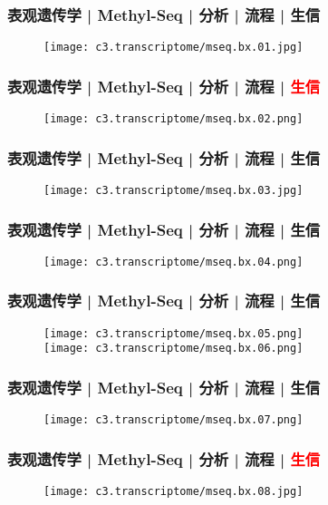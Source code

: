 \begin{frame}
  \frametitle{表观遗传学 | Methyl-Seq | 分析 | 流程 | 生信}
  \begin{figure}
    \centering
    \texttt{[image: c3.transcriptome/mseq.bx.01.jpg]}
  \end{figure}
\end{frame}

\begin{frame}
  \frametitle{表观遗传学 | Methyl-Seq | 分析 | 流程 | \textcolor{red}{生信}}
  \begin{figure}
    \centering
    \texttt{[image: c3.transcriptome/mseq.bx.02.png]}
  \end{figure}
\end{frame}

\begin{frame}
  \frametitle{表观遗传学 | Methyl-Seq | 分析 | 流程 | 生信}
  \begin{figure}
    \centering
    \texttt{[image: c3.transcriptome/mseq.bx.03.jpg]}
  \end{figure}
\end{frame}

\begin{frame}
  \frametitle{表观遗传学 | Methyl-Seq | 分析 | 流程 | 生信}
  \begin{figure}
    \centering
    \texttt{[image: c3.transcriptome/mseq.bx.04.png]}
  \end{figure}
\end{frame}

\begin{frame}
  \frametitle{表观遗传学 | Methyl-Seq | 分析 | 流程 | 生信}
  \begin{figure}
    \centering
    \texttt{[image: c3.transcriptome/mseq.bx.05.png]}\\
    \texttt{[image: c3.transcriptome/mseq.bx.06.png]}
  \end{figure}
\end{frame}

\begin{frame}
  \frametitle{表观遗传学 | Methyl-Seq | 分析 | 流程 | 生信}
  \begin{figure}
    \centering
    \texttt{[image: c3.transcriptome/mseq.bx.07.png]}
  \end{figure}
\end{frame}

\begin{frame}
  \frametitle{表观遗传学 | Methyl-Seq | 分析 | 流程 | \textcolor{red}{生信}}
  \begin{figure}
    \centering
    \texttt{[image: c3.transcriptome/mseq.bx.08.jpg]}
  \end{figure}
\end{frame}

